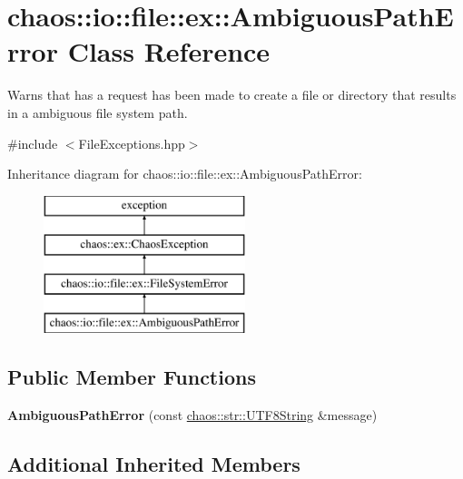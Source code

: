 \hypertarget{classchaos_1_1io_1_1file_1_1ex_1_1_ambiguous_path_error}{}\section{chaos\+:\+:io\+:\+:file\+:\+:ex\+:\+:Ambiguous\+Path\+Error Class Reference}
\label{classchaos_1_1io_1_1file_1_1ex_1_1_ambiguous_path_error}


Warns that has a request has been made to create a file or directory that results in a ambiguous file system path.  




{\ttfamily \#include $<$File\+Exceptions.\+hpp$>$}

Inheritance diagram for chaos\+:\+:io\+:\+:file\+:\+:ex\+:\+:Ambiguous\+Path\+Error\+:\begin{figure}[H]
\begin{center}
\leavevmode
\includegraphics[height=4.000000cm]{classchaos_1_1io_1_1file_1_1ex_1_1_ambiguous_path_error}
\end{center}
\end{figure}
\subsection*{Public Member Functions}
\begin{DoxyCompactItemize}
\item 
\hypertarget{classchaos_1_1io_1_1file_1_1ex_1_1_ambiguous_path_error_a959cd9a1f6204c532cd6f33e29efb84c}{}{\bfseries Ambiguous\+Path\+Error} (const \hyperlink{classchaos_1_1str_1_1_u_t_f8_string}{chaos\+::str\+::\+U\+T\+F8\+String} \&message)\label{classchaos_1_1io_1_1file_1_1ex_1_1_ambiguous_path_error_a959cd9a1f6204c532cd6f33e29efb84c}

\end{DoxyCompactItemize}
\subsection*{Additional Inherited Members}


